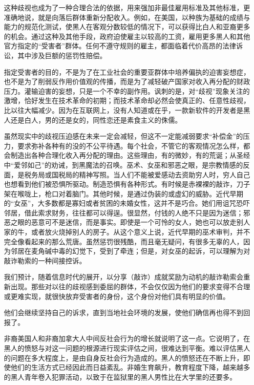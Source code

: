 这种歧视也成为了一种合理合法的依据，用来强加非最佳雇用标准及其他标准，更准确地说，就是向落后群体重新分配收入。例如，在美国，以种族为基础的成绩与能力的规范化测试，使黑人在客观分数较低的情况下，可以获得比白人和亚裔更多的机会。通过这种及其他手段，政府迫使雇主以较高的工资，雇用更多黑人和其他官方指定的“受害者”群体。任何不遵守规则的雇主，都面临着代价高昂的法律诉讼，其中涉及巨额的惩罚性赔偿。

指定受害者的目的，不是为了在工业社会的重要亚群体中培养偏执的迫害妄想症，也不是为了削弱反作用价值观的传播，而是为了减轻破产国家对收入再分配的财政压力。灌输迫害的妄想，只是一个不幸的副作用。讽刺的是，对“歧视”现象关注的激增，恰好发生在技术革命的初期；而技术革命却必然会使真正的、任意性歧视，比以往大幅减少。因为在互联网上，没有人知道或在乎，一款新软件的开发者是黑人还是白人，男的还是女的，同性恋还是素食主义的侏儒。

虽然现实中的歧视压迫感在未来一定会减轻，但这不一定能减弱要求“补偿金”的压力，要求弥补各种有的没的不公平待遇。每个社会，不管它的客观情况怎么样，都会制造出各种合理化收入再分配的理由。这些理由，有的微妙，有的荒诞；从圣经中“爱邻如己”的劝诫，到黑魔法的召唤。巫术、女巫和邪恶之眼，是宗教情感的反面，是税务局或国税局的精神写照。当人们不能被爱感动去资助穷人时，穷人自己也想看到他们被恐惧所驱动。制造恐惧有各种形式。有时候是赤裸裸的敲诈，刀子架在喉咙上，枪口对着脑门。其他时候，是通过伪装的或虚幻的威胁。近代早期的“女巫”，大多数都是寡妇或者贫困的未婚女性，这并不是巧合。她们用诅咒恐吓邻居，借此索求财务，往往都可以得逞。很显然，付钱的人绝不只是因为迷信；邪恶之眼的恶意可不是迷信，而是事实。即使是一个可怜的女人，她也可以放走别人家的牛，或者放火烧掉别人的房子。从这个意义上说，近代早期的巫术审判，并不完全像看起来的那么荒唐。虽然惩罚很残酷，而且毫无疑问，有很多无辜的人，因为邻居在麦角碱中毒的幻觉下，受到了牵连；但是，对女巫的起诉，可以理解为对敲诈勒索的一种间接控诉。

我们预计，随着信息时代的展开，以分享（敲诈）成就奖励为动机的敲诈勒索会重新出现。那些对以往的歧视感到委屈的群体，不会仅仅因为他们的要求变得不合理或更难实现，就很快放弃受害者的身份，这个身份对他们具有明显的价值。

他们会继续坚持自己的诉求，直到当地社会环境的发展，使他们确信再也得不到回报了。

非裔美国人和非裔加拿大人中间反社会行为的增长就说明了这一点。它说明了，在黑人的愤怒与对这一问题的根源进行现实评估之间，很难达到平衡。难以评估黑人的问题在多大程度上，是由自身反社会行为造成的。黑人的愤怒还在不断上升，即使他们的生活方式已经因此而日益紊乱。非婚生育飙升，教育程度下降，越来越多的黑人青年卷入犯罪活动，以致于在监狱里的黑人男性比在大学里的还要多。

